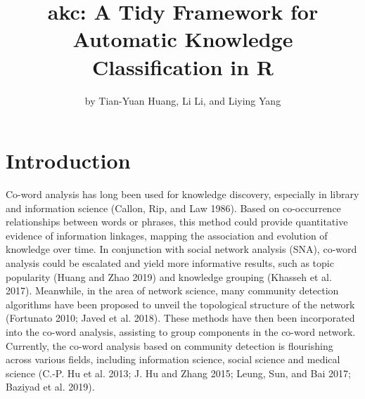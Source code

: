 \title{akc: A Tidy Framework for Automatic Knowledge Classification in R}
\author{by Tian-Yuan Huang, Li Li, and Liying Yang}

\maketitle


\hypertarget{introduction}{%
\section{Introduction}\label{introduction}}

Co-word analysis has long been used for knowledge discovery, especially in library and information science (Callon, Rip, and Law 1986). Based on co-occurrence relationships between words or phrases, this method could provide quantitative evidence of information linkages, mapping the association and evolution of knowledge over time. In conjunction with social network analysis (SNA), co-word analysis could be escalated and yield more informative results, such as topic popularity (Huang and Zhao 2019) and knowledge grouping (Khasseh et al. 2017). Meanwhile, in the area of network science, many community detection algorithms have been proposed to unveil the topological structure of the network (Fortunato 2010; Javed et al. 2018). These methods have then been incorporated into the co-word analysis, assisting to group components in the co-word network. Currently, the co-word analysis based on community detection is flourishing across various fields, including information science, social science and medical science (C.-P. Hu et al. 2013; J. Hu and Zhang 2015; Leung, Sun, and Bai 2017; Baziyad et al. 2019).

